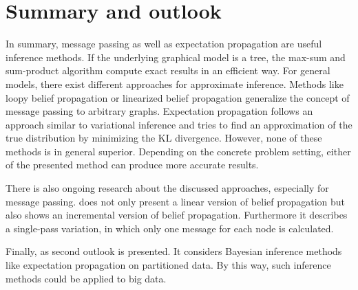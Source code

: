 \documentclass{sigkdd}
\begin{document}
\section{Summary and outlook}
In summary, message passing as well as expectation propagation are useful inference methods. If the underlying graphical model is a tree, the max-sum and sum-product algorithm compute exact results in an efficient way. For general models, there exist different approaches for approximate inference. Methods like loopy belief propagation or linearized belief propagation generalize the concept of message passing to arbitrary graphs. Expectation propagation follows an approach similar to variational inference and tries to find an approximation of the true distribution by minimizing the KL divergence.
However, none of these methods is in general superior. Depending on the concrete problem setting, either of the presented method can produce more accurate results.

There is also ongoing research about the discussed approaches, especially for message passing. \cite{Gatterbauer:2015:LSB:2735479.2735490} does not only present a linear version of belief propagation but also shows an incremental version of belief propagation. Furthermore it describes a single-pass variation, in which only one message for each node is calculated.

Finally, as second outlook \cite{bibid} is presented. It considers Bayesian inference methods like expectation propagation on partitioned data. By this way, such inference methods could be applied to big data.




\nocite{*}
\end{document}

